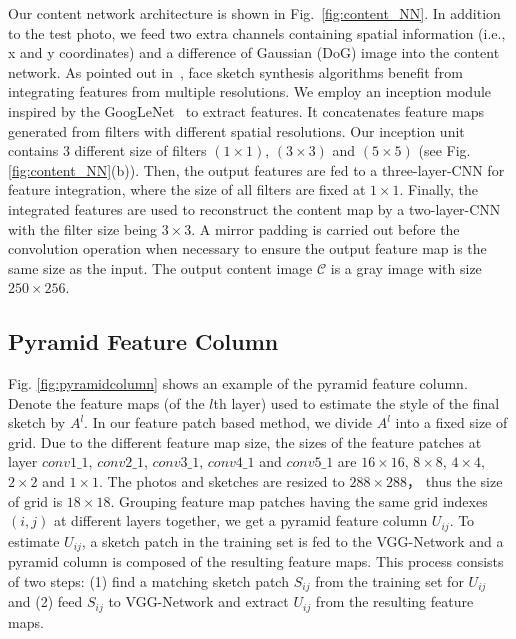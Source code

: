 \documentclass[10pt,twocolumn,letterpaper]{article}
\begin{document}
Our content network architecture is shown in Fig.~\ref{fig:content_NN}. In addition to the test photo, we feed two extra channels containing spatial information (i.e., x and y coordinates) and a difference of Gaussian (DoG) image into the content network. As pointed out in~\cite{wang2009face}, face sketch synthesis algorithms benefit from integrating features from multiple resolutions. We employ an inception module inspired by the GoogLeNet~\cite{szegedy2015going} to extract features. It concatenates feature maps generated from filters with different spatial resolutions. Our inception unit contains 3 different size of filters $(1\times1)$, $(3\times3)$ and $(5\times5)$ (see Fig. \ref{fig:content_NN}(b)). Then, the output features are fed to a three-layer-CNN for feature integration, where the size of all filters are fixed at $1\times1$. Finally, the integrated features are used to reconstruct the content map by a two-layer-CNN with the filter size being $3\times3$. A mirror padding is carried out before the convolution operation when necessary to ensure the output feature map is the same size as the input. The output content image $\mathcal{C}$ is a gray image with size $250\times256$.

\subsection{Pyramid Feature Column}

Fig. \ref{fig:pyramidcolumn} shows an example of the pyramid feature column. Denote the feature maps (of the $l$th layer) used to estimate the style of the final sketch by $A^{l}$. In our feature patch based method, we divide $A^{l}$ into a fixed size of grid. Due to the different feature map size, the sizes of the feature patches at layer $conv1\_1$, $conv2\_1$, $conv3\_1$, $conv4\_1$ and $conv5\_1$ are $16\times16$, $8\times8$, $4\times4$, $2\times2$ and $1\times1$. The photos and sketches are resized to $288\times288$， thus the size of grid is $18\times18$. Grouping feature map patches having the same grid indexes $(i, j)$ at different layers together, we get a pyramid feature column $U_{ij}$. To estimate $U_{ij}$, a sketch patch in the training set is fed to the VGG-Network and a pyramid column is composed of the resulting feature maps. This process consists of two steps: (1) find a matching sketch patch $S_{ij}$ from the training set for $U_{ij}$ and (2) feed $S_{ij}$ to VGG-Network and extract $U_{ij}$ from the resulting feature maps.
\end{document}
